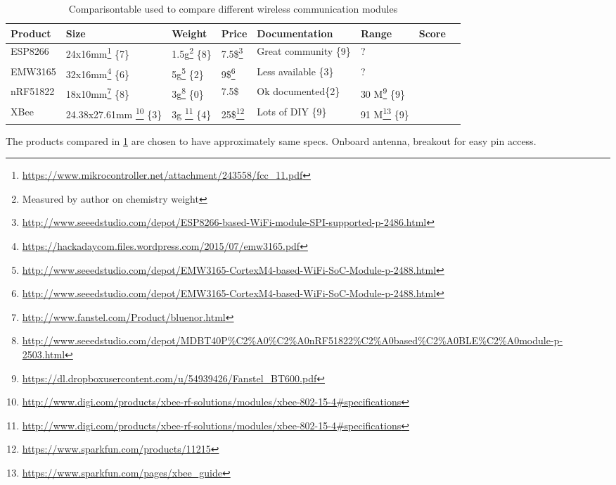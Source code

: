 \begin{table}[H]
	\centering
	\begin{tabular}{@{}|l|l|l|l|l|l|l|l|@{}}
		\toprule
		\textbf{Product} & \textbf{Size} & \textbf{Weight} & \textbf{Price} & \textbf{Documentation} &  \textbf{Range}  & \textbf{Score} \\ \midrule
		ESP8266   &  24x16mm\footnote{\url{https://www.mikrocontroller.net/attachment/243558/fcc\_11.pdf}} \hfill\{7\} & 1.5g\footnote{Measured by author on chemistry weight} \hfill\{8\} &   7.5\$\footnote{\url{http://www.seeedstudio.com/depot/ESP8266-based-WiFi-module-SPI-supported-p-2486.html}}    &   Great community \hfill\{9\}  &    ?    &                		\\ \midrule
		EMW3165   &  32x16mm\footnote{\url{https://hackadaycom.files.wordpress.com/2015/07/emw3165.pdf}} \hfill\{6\}  & 5g\footnote{\url{http://www.seeedstudio.com/depot/EMW3165-CortexM4-based-WiFi-SoC-Module-p-2488.html}} \hfill\{2\} &  9\$\footnote{\url{http://www.seeedstudio.com/depot/EMW3165-CortexM4-based-WiFi-SoC-Module-p-2488.html}}   &  Less available  \hfill\{3\}	        &    ?    &                		\\ \midrule
		nRF51822  &  18x10mm\footnote{\url{http://www.fanstel.com/Product/bluenor.html}} \hfill\{8\}  & 3g\footnote{\url{http://www.seeedstudio.com/depot/MDBT40P\%C2\%A0\%C2\%A0nRF51822\%C2\%A0based\%C2\%A0BLE\%C2\%A0module-p-2503.html}} \hfill\{0\}  &  7.5\$  & Ok documented\hfill\{2\} 	        &   30 M\footnote{\url{https://dl.dropboxusercontent.com/u/54939426/Fanstel_BT600.pdf}}  \hfill\{9\}     &                		\\ \midrule
		XBee      &  24.38x27.61mm \footnote{\url{http://www.digi.com/products/xbee-rf-solutions/modules/xbee-802-15-4\#specifications}} \{3\} & 3g \footnote{\url{http://www.digi.com/products/xbee-rf-solutions/modules/xbee-802-15-4\#specifications}} \hfill\{4\} &   25\$\footnote{\url{https://www.sparkfun.com/products/11215}}    &  Lots of DIY   \hfill\{9\}      &            91 M\footnote{\url{https://www.sparkfun.com/pages/xbee_guide}}  \hfill\{9\}  &                    \\ \bottomrule
	\end{tabular}
	\caption{Comparisontable used to compare different wireless 		communication modules}
	\label{tab:compare_table_wireless_communication}
\end{table}
The products compared in \ref{tab:compare_table_wireless_communication} are chosen to have approximately same specs. Onboard antenna, breakout for easy pin access.

